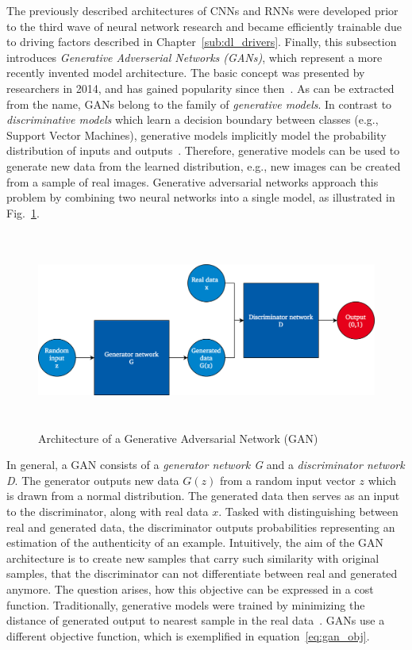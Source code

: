 The previously described architectures of CNNs and RNNs were developed prior to
the third wave of neural network research and became efficiently trainable
due to driving factors described in Chapter~\ref{sub:dl_drivers}.
Finally, this subsection introduces \textit{Generative Adverserial Networks (GANs)}, which
represent a more recently invented model architecture.
The basic concept was presented by researchers in 2014, and has gained popularity
since then~\cite{Goodfellow2014}.
As can be extracted from the name, GANs belong to the family of \textit{generative
models}.
In contrast to \textit{discriminative models} which learn a decision boundary
between classes (e.g., Support Vector Machines), generative models implicitly 
model the probability distribution of inputs and outputs~\cite{Bishop2006}.
Therefore, generative models can be used to generate new data from the learned
distribution, e.g., new images can be created from a sample of real images.
Generative adversarial networks approach this problem by combining two neural 
networks into a single model, as illustrated in Fig.~\ref{fig:gan_architecture}.

\begin{figure}[h]
  \centering
  \includegraphics[height=6.5cm]{img/gan_architecture}
  \caption{Architecture of a Generative Adversarial Network (GAN)}
\label{fig:gan_architecture}
\end{figure}

In general, a GAN consists of a \textit{generator network G} and a \textit{discriminator network D}.
The generator outputs new data $G(z)$ from a random input vector $z$ which is
drawn from a normal distribution.
The generated data then serves as an input to the discriminator, along with
real data $x$.
Tasked with distinguishing between real and generated data, the discriminator
outputs probabilities representing an estimation of the authenticity of an
example.
Intuitively, the aim of the GAN architecture is to create new samples that carry
such similarity with original samples, that the discriminator can not differentiate
between real and generated anymore.
The question arises, how this objective can be expressed in a cost function.
Traditionally, generative models were trained by minimizing the distance of
generated output to nearest sample in the real data~\cite{Goodfellow2014}.
GANs use a different objective function, which is exemplified in equation~\ref{eq:gan_obj}.

